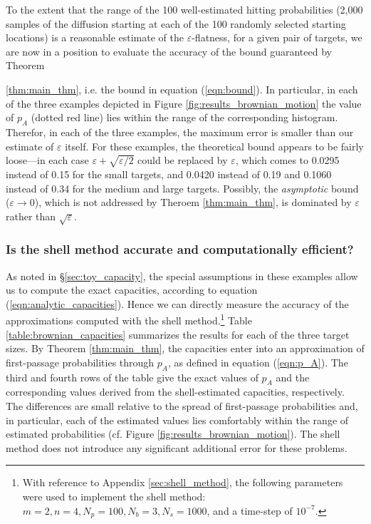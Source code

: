 \documentclass[12pt, nofootinbib,english, amsmath, amssymb, aps, priprint, graphicx,floatfix]{revtex4-1}
\theoremstyle{plain}
\theoremstyle{definition}
\theoremstyle{plain}
\begin{document}
To the extent that the range of the 100 well-estimated hitting probabilities (2,000 samples of the diffusion starting at each of the 100 randomly selected starting locations) is a reasonable estimate of the $\varepsilon$-flatness, for a given pair of targets,
we are now in a position to evaluate the accuracy of the bound guaranteed by Theorem {\ref{thm:main_thm}, i.e. the bound in equation (\ref{eqn:bound}). In particular, in each of the three examples depicted in Figure \ref{fig:results_brownian_motion}
the value of $p_A$ (dotted red line) lies within the range of the corresponding histogram. Therefor, in each of the three examples,  the maximum error is smaller than our estimate of $\varepsilon$ itself. For these examples, the theoretical bound appears to be fairly loose---in each case  $\varepsilon +
\sqrt{\varepsilon/2}$  could be replaced by  $\varepsilon$, which comes to 0.0295 instead of 0.15 for the small targets, and 0.0420 instead of 0.19 and 0.1060 instead of 0.34 for the medium and large targets. Possibly, the {\em asymptotic} bound ($\varepsilon\to
0$), which is not addressed by Theroem \ref{thm:main_thm},
is dominated by $\varepsilon$ rather than $\sqrt{\varepsilon}$.


\subsubsection{Is the shell method accurate and computationally efficient?}
\label{sec:toy_shell}
As noted in \S\ref{sec:toy_capacity}, the special assumptions in these examples allow us to compute the exact capacities, according to equation (\ref{eqn:analytic_capacities}). Hence we can directly measure the accuracy of the approximations computed with the shell method.\footnote{With reference to Appendix \ref{sec:shell_method}, the following parameters were used to implement the shell method: $m = 2, n = 4, N_p = 100, N_b = 3, N_s = 1000$, and a time-step of $10^{-7}$.}
Table \ref{table:brownian_capacities} summarizes the results for
each of the three target sizes. 
By Theorem \ref{thm:main_thm}, the capacities enter into an approximation of first-passage probabilities through $p_A$, 
as defined in equation (\ref{eqn:p_A}). 
The third and fourth rows of the table give the exact values of $p_A$ and the corresponding values derived from the shell-estimated capacities, respectively. The differences are small relative to the spread of first-passage probabilities and, in particular, each of the estimated values lies comfortably within the range of estimated probabilities (cf. Figure 
\ref{fig:results_brownian_motion}).
The shell method does not introduce any significant additional error for these problems.


}
\end{document}
